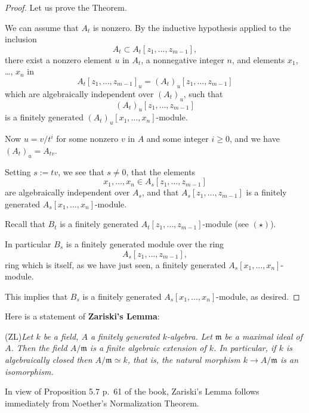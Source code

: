 \documentclass[parskip=half,fontsize=12pt]{scrartcl}%
\newcommand{\mf}{\mathfrak}
\newcommand{\mmm}{\mf m}
\begin{document}
\begin{proof}
Let us prove the Theorem.

We can assume that $A_t$ is nonzero. By the inductive hypothesis applied to the inclusion 
$$
A_t\subset A_t[z_1,\dots,z_{m-1}],
$$ 
there exist a nonzero element $u$ in $A_t$, a nonnegative integer $n$, and elements $x_1$, \dots, $x_n$ in 
$$
A_t[z_1,\dots,z_{m-1}]_u=(A_t)_u[z_1,\dots,z_{m-1}]
$$ 
which are algebraically independent over $(A_t)_u$, such that 
$$
(A_t)_u[z_1,\dots,z_{m-1}]
$$ 
is a finitely generated $(A_t)_u[x_1,\dots,x_n]$-module. 

Now $u=v/t^i$ for some nonzero $v$ in $A$ and some integer $i\ge0$, and we have $(A_t)_u=A_{tv}$. 

Setting $s:=tv$, we see that $s\ne0$, that the elements 
$$
x_1,\dots,x_n\in A_s[z_1,\dots,z_{m-1}]
$$ 
are algebraically independent over $A_s$, and that $A_s[z_1,\dots,z_{m-1}]$ is a finitely generated $A_s[x_1,\dots,x_n]$-module. 

Recall that $B_t$ is a finitely generated $A_t[z_1,\dots,z_{m-1}]$-module (see $(\star)$). 

In particular $B_s$ is a finitely generated module over the ring $$A_s[z_1,\dots,z_{m-1}],$$ ring which is itself, as we have just seen, a finitely generated $A_s[x_1,\dots,x_n]$-module. 

This implies that $B_s$ is a finitely generated $A_s[x_1,\dots,x_n]$-module, as desired.
\end{proof} 


Here is a statement of \textbf{Zariski's Lemma}:

(ZL)\emph{Let $k$ be a field, $A$ a finitely generated $k$-algebra. Let $\mmm$ be a maximal ideal of $A$. Then the field $A/\mmm$ is a finite algebraic extension of $k$. In particular, if $k$ is algebraically closed then $A/\mmm\simeq k$, that is, the natural morphism $k\to A/\mmm$ is an isomorphism.}

In view of Proposition 5.7 p.~61 of the book, Zariski's Lemma follows immediately from Noether's Normalization Theorem. %
\end{document}

